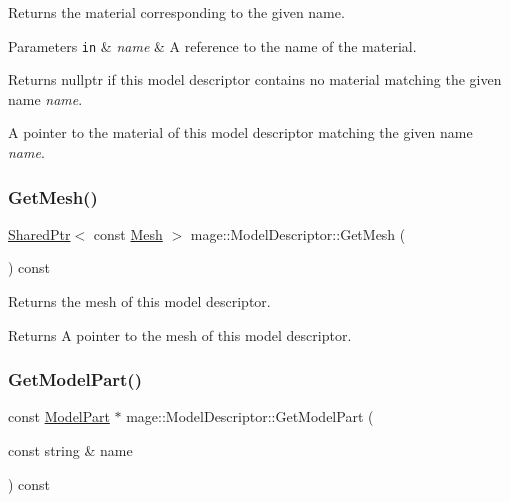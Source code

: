 Returns the material corresponding to the given name.


\begin{DoxyParams}[1]{Parameters}
\mbox{\tt in}  & {\em name} & A reference to the name of the material. \\
\hline
\end{DoxyParams}
\begin{DoxyReturn}{Returns}
{\ttfamily nullptr} if this model descriptor contains no material matching the given name {\itshape name}. 

A pointer to the material of this model descriptor matching the given name {\itshape name}. 
\end{DoxyReturn}
\hypertarget{classmage_1_1_model_descriptor_a730dedd388929c74ed504395ad2601fc}{}\label{classmage_1_1_model_descriptor_a730dedd388929c74ed504395ad2601fc} 
\subsubsection{\texorpdfstring{Get\+Mesh()}{GetMesh()}}
{\footnotesize\ttfamily \hyperlink{namespacemage_a1e01ae66713838a7a67d30e44c67703e}{Shared\+Ptr}$<$ const \hyperlink{classmage_1_1_mesh}{Mesh} $>$ mage\+::\+Model\+Descriptor\+::\+Get\+Mesh (\begin{DoxyParamCaption}{ }\end{DoxyParamCaption}) const\hspace{0.3cm}{\ttfamily [noexcept]}}

Returns the mesh of this model descriptor.

\begin{DoxyReturn}{Returns}
A pointer to the mesh of this model descriptor. 
\end{DoxyReturn}
\hypertarget{classmage_1_1_model_descriptor_a9c8e98d71883edd33b9d6c1964e7bf36}{}\label{classmage_1_1_model_descriptor_a9c8e98d71883edd33b9d6c1964e7bf36} 
\subsubsection{\texorpdfstring{Get\+Model\+Part()}{GetModelPart()}}
{\footnotesize\ttfamily const \hyperlink{structmage_1_1_model_part}{Model\+Part} $\ast$ mage\+::\+Model\+Descriptor\+::\+Get\+Model\+Part (\begin{DoxyParamCaption}\item[{const string \&}]{name }\end{DoxyParamCaption}) const\hspace{0.3cm}{\ttfamily [noexcept]}}

